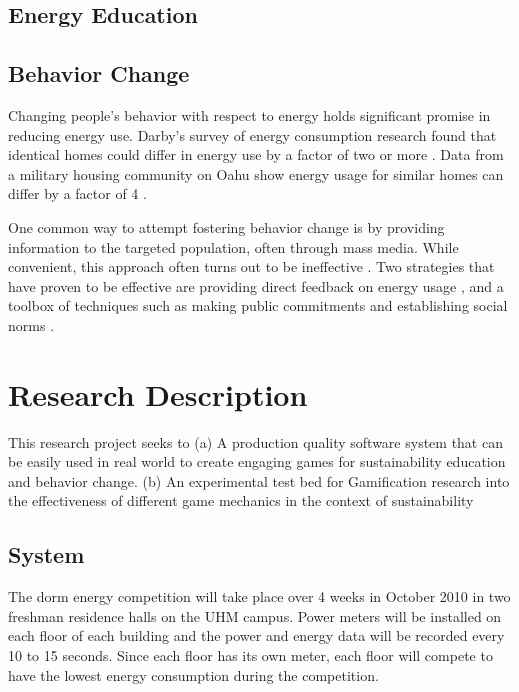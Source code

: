 \subsection{Energy Education}

\subsection{Behavior Change}

Changing people's behavior with respect to energy holds significant promise in reducing energy use. Darby's survey of energy consumption research found that identical homes could differ in energy use by a factor of two or more \cite{darby-review-2006}. Data from a military housing community on Oahu show energy usage for similar homes can differ by a factor of 4 \cite{Norton2010ZeroEnergyHomes}.

One common way to attempt fostering behavior change is by providing information to the targeted population, often through mass media. While convenient, this approach often turns out to be ineffective \cite{McKenzie-Mohr2009}. Two strategies that have proven to be effective are providing direct feedback on energy usage \cite{darby-review-2006}, and a toolbox of techniques such as making public commitments and establishing social norms \cite{McKenzie-Mohr2009}. 


\section{Research Description}

This research project seeks to (a) A production quality software system that can be easily used in real world to create engaging games for sustainability education and behavior change. (b) An experimental test bed for Gamification research into the effectiveness of different game mechanics in the context of sustainability

\subsection{System}
The dorm energy competition will take place over 4 weeks in October 2010 in two freshman residence halls on the UHM campus. Power meters will be installed on each floor of each building and the power and energy data will be recorded every 10 to 15 seconds. Since each floor has its own meter, each floor will compete to have the lowest energy consumption during the competition.

